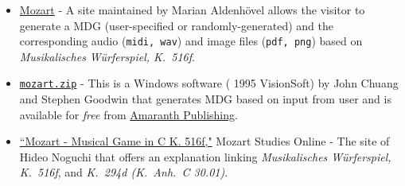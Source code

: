 \documentclass[a4paper,x11names,svgnames,10pt]{article}
\begin{document}
{\begin{itemize}
	\item  \href{https://marian-aldenhoevel.de/mozart/}{Mozart} - A site maintained by Marian Aldenh\"{o}vel allows the visitor to generate a MDG (user-specified or randomly-generated) and the corresponding audio ({\tt midi, wav}) and image files ({\tt pdf, png}) based on {\em Musikalisches W\"{u}rferspiel, K.\ 516f}.
 	
 	\item \href{https://www.amaranthpublishing.com/MozartDiceGame.htm}{\tt mozart.zip} -  This is a Windows software ({\small\textcopyright} 1995 VisionSoft) by John Chuang and Stephen Goodwin that generates MDG based on input from user and is available for {\it free} from  \href{http://www.amaranthpublishing.com/MozartDiceGame.htm}{Amaranth Publishing}.  
 	
 	\item \href{(http://www.asahi-net.or.jp/\~rb5h-ngc/e/k516f.htm}{``Mozart - Musical Game in C K. 516f,"}	Mozart Studies Online - The site of Hideo Noguchi that offers an explanation linking {\em Musikalisches W\"{u}rferspiel, K.\ 516f}, and  {\em K.\ 294d (K.\ Anh.\ C 30.01)}. 
\end{itemize}

}
\end{document}
